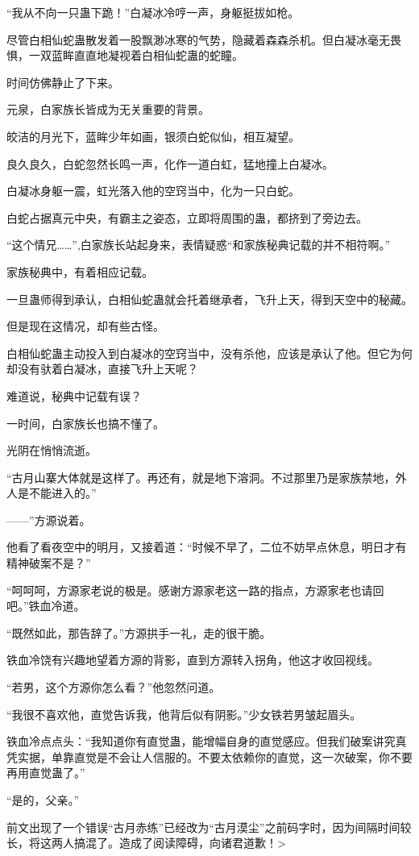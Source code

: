 \begin{this_body}
“我从不向一只蛊下跪！”白凝冰冷哼一声，身躯挺拔如枪。

尽管白相仙蛇蛊散发着一股飘渺冰寒的气势，隐藏着森森杀机。但白凝冰毫无畏惧，一双蓝眸直直地凝视着白相仙蛇蛊的蛇瞳。

时间仿佛静止了下来。

元泉，白家族长皆成为无关重要的背景。

皎洁的月光下，蓝眸少年如画，银须白蛇似仙，相互凝望。

良久良久，白蛇忽然长鸣一声，化作一道白虹，猛地撞上白凝冰。

白凝冰身躯一震，虹光落入他的空窍当中，化为一只白蛇。

白蛇占据真元中央，有霸主之姿态，立即将周围的蛊，都挤到了旁边去。

“这个情兄……”,白家族长站起身来，表情疑惑“和家族秘典记载的并不相符啊。”

家族秘典中，有着相应记载。

一旦蛊师得到承认，白相仙蛇蛊就会托着继承者，飞升上天，得到天空中的秘藏。

但是现在这情况，却有些古怪。

白相仙蛇蛊主动投入到白凝冰的空窍当中，没有杀他，应该是承认了他。但它为何却没有驮着白凝冰，直接飞升上天呢？

难道说，秘典中记载有误？

一时间，白家族长也搞不懂了。

光阴在悄悄流逝。

“古月山寨大体就是这样了。再还有，就是地下溶洞。不过那里乃是家族禁地，外人是不能进入的。”

——”方源说着。

他看了看夜空中的明月，又接着道：“时候不早了，二位不妨早点休息，明日才有精神破案不是？”

“呵呵呵，方源家老说的极是。感谢方源家老这一路的指点，方源家老也请回吧。”铁血冷道。

“既然如此，那告辞了。”方源拱手一礼，走的很干脆。

铁血冷饶有兴趣地望着方源的背影，直到方源转入拐角，他这才收回视线。

“若男，这个方源你怎么看？”他忽然问道。

“我很不喜欢他，直觉告诉我，他背后似有阴影。”少女铁若男皱起眉头。

铁血冷点点头：“我知道你有直觉蛊，能增幅自身的直觉感应。但我们破案讲究真凭实据，单靠直觉是不会让人信服的。不要太依赖你的直觉，这一次破案，你不要再用直觉蛊了。”

“是的，父亲。”

前文出现了一个错误“古月赤练”已经改为“古月漠尘”之前码字时，因为间隔时间较长，将这两人搞混了。造成了阅读障碍，向诸君道歉！>

\end{this_body}

